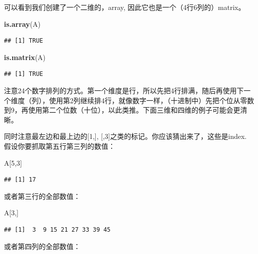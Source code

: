 \documentclass[]{book}
\newenvironment{Shaded}{\begin{snugshade}}{\end{snugshade}}
\newcommand{\DecValTok}[1]{\textcolor[rgb]{0.00,0.00,0.81}{#1}}
\newcommand{\KeywordTok}[1]{\textcolor[rgb]{0.13,0.29,0.53}{\textbf{#1}}}
\newcommand{\NormalTok}[1]{#1}
\begin{document}
可以看到我们创建了一个二维的，array, 因此它也是一个（4行6列的）matrix。

\begin{Shaded}
\begin{Highlighting}[]
\KeywordTok{is.array}\NormalTok{(A)}
\end{Highlighting}
\end{Shaded}

\begin{verbatim}
## [1] TRUE
\end{verbatim}

\begin{Shaded}
\begin{Highlighting}[]
\KeywordTok{is.matrix}\NormalTok{(A)}
\end{Highlighting}
\end{Shaded}

\begin{verbatim}
## [1] TRUE
\end{verbatim}

注意24个数字排列的方式。第一个维度是行，所以先把4行排满，随后再使用下一个维度（列），使用第2列继续排4行，就像数字一样，（十进制中）先把个位从零数到9，再使用第二个位数（十位），以此类推。下面三维和四维的例子可能会更清晰。

同时注意最左边和最上边的{[}1,{]}, {[},3{]}之类的标记。你应该猜出来了，这些是index. 假设你要抓取第五行第三列的数值：

\begin{Shaded}
\begin{Highlighting}[]
\NormalTok{A[}\DecValTok{5}\NormalTok{,}\DecValTok{3}\NormalTok{]}
\end{Highlighting}
\end{Shaded}

\begin{verbatim}
## [1] 17
\end{verbatim}

或者第三行的全部数值：

\begin{Shaded}
\begin{Highlighting}[]
\NormalTok{A[}\DecValTok{3}\NormalTok{,]}
\end{Highlighting}
\end{Shaded}

\begin{verbatim}
## [1]  3  9 15 21 27 33 39 45
\end{verbatim}

或者第四列的全部数值：
\end{document}
